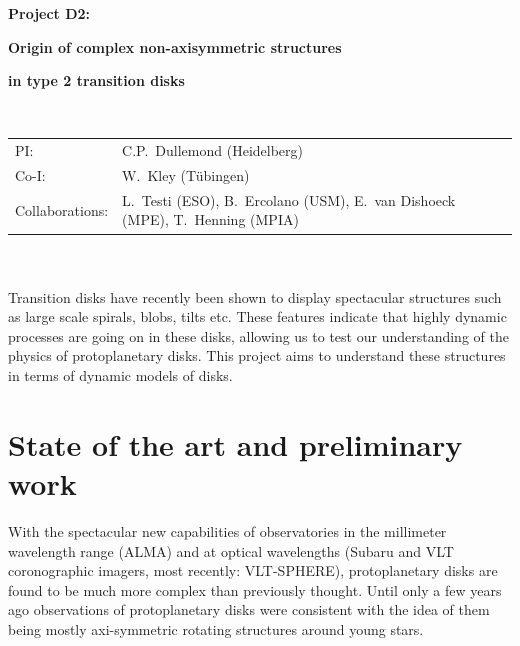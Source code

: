 \documentclass[10pt,fleqn,twoside]{article}
\begin{document}
\newpage


\setcounter{page}{1}

\centerline{\huge\bf\Tcol
%
%
%
%
%
 Project D2:}
\vspace{1em}

\centerline{\LARGE\bf\Tcol Origin of complex non-axisymmetric structures}\vspace{0.3em}
\centerline{\LARGE\bf\Tcol in type 2 transition disks}

%
%
%
%
%
\vskip1.0cm


\\
\begin{tabular}{ll}
{\textsf{PI:}}                 & C.P.~Dullemond (Heidelberg)\\
{\textsf{Co-I:}}               & W.~Kley (T\"ubingen)\\
{\textsf{Collaborations:}}     & L.~Testi (ESO), B.~Ercolano (USM), E.~van Dishoeck (MPE), T.~Henning (MPIA)\\
\end{tabular}



\vspace{1em}
 \\

\vspace{1em}
\\
Transition disks have recently been shown to display spectacular structures
such as large scale spirals, blobs, tilts etc. These features indicate that
highly dynamic processes are going on in these disks, allowing us to test
our understanding of the physics of protoplanetary disks. This project aims
to understand these structures in terms of dynamic models of disks.


\section{State of the art and preliminary work}
\renewcommand{\leftmark}{\sc State of the Art and preliminary work}
With the spectacular new capabilities of observatories in the millimeter
wavelength range (ALMA) and at optical wavelengths (Subaru and VLT
coronographic imagers, most recently: VLT-SPHERE), protoplanetary disks are
found to be much more complex than previously thought. Until only a few
years ago observations of protoplanetary disks were consistent with the idea
of them being mostly axi-symmetric rotating structures around young stars.  
\end{document}
